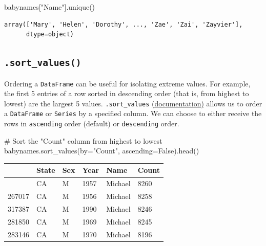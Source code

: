 \documentclass[
  letterpaper,
  DIV=11,
  numbers=noendperiod]{scrreprt}
\newenvironment{Shaded}{\begin{snugshade}}{\end{snugshade}}
\newcommand{\CommentTok}[1]{\textcolor[rgb]{0.37,0.37,0.37}{#1}}
\newcommand{\NormalTok}[1]{\textcolor[rgb]{0.00,0.23,0.31}{#1}}
\newcommand{\OperatorTok}[1]{\textcolor[rgb]{0.37,0.37,0.37}{#1}}
\newcommand{\StringTok}[1]{\textcolor[rgb]{0.13,0.47,0.30}{#1}}
\newcommand{\VariableTok}[1]{\textcolor[rgb]{0.07,0.07,0.07}{#1}}
\begin{document}
\begin{Shaded}
\begin{Highlighting}[]
\NormalTok{babynames[}\StringTok{"Name"}\NormalTok{].unique()}
\end{Highlighting}
\end{Shaded}

\begin{verbatim}
array(['Mary', 'Helen', 'Dorothy', ..., 'Zae', 'Zai', 'Zayvier'],
      dtype=object)
\end{verbatim}

\subsection{\texorpdfstring{\texttt{.sort\_values()}}{.sort\_values()}}\label{sort_values}

Ordering a \texttt{DataFrame} can be useful for isolating extreme
values. For example, the first 5 entries of a row sorted in descending
order (that is, from highest to lowest) are the largest 5 values.
\texttt{.sort\_values}
\href{https://pandas.pydata.org/docs/reference/api/pandas.DataFrame.sort_values.html}{(documentation)}
allows us to order a \texttt{DataFrame} or \texttt{Series} by a
specified column. We can choose to either receive the rows in
\texttt{ascending} order (default) or \texttt{descending} order.

\begin{Shaded}
\begin{Highlighting}[]
\CommentTok{\# Sort the "Count" column from highest to lowest}
\NormalTok{babynames.sort\_values(by}\OperatorTok{=}\StringTok{"Count"}\NormalTok{, ascending}\OperatorTok{=}\VariableTok{False}\NormalTok{).head()}
\end{Highlighting}
\end{Shaded}

\begin{longtable}[]{@{}llllll@{}}
\toprule\noalign{}
& State & Sex & Year & Name & Count \\
\midrule\noalign{}
\endhead
\bottomrule\noalign{}
\endlastfoot
268041 & CA & M & 1957 & Michael & 8260 \\
267017 & CA & M & 1956 & Michael & 8258 \\
317387 & CA & M & 1990 & Michael & 8246 \\
281850 & CA & M & 1969 & Michael & 8245 \\
283146 & CA & M & 1970 & Michael & 8196 \\
\end{longtable}
\end{document}
